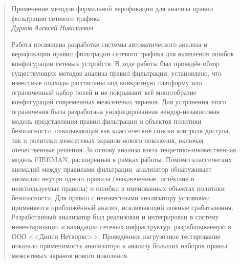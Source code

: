 \begin{abstract}

    \begin{center}
    \large{Применение методов формальной верификации для анализа правил фильтрации сетевого трафика} \\[0.5 cm]
    \large{\textit{Дурнов Алексей Николаевич}} \\[1 cm]
    \end{center}

    Работа посвящена разработке системы автоматического анализа и верификации правил фильтрации сетевого трафика для выявления ошибок конфигурации сетевых устройств.
    В ходе работы был проведён обзор существующих методов анализа правил фильтрации; установлено, что известные подходы рассчитаны под конкретную платформу или ограниченный набор полей и не покрывают всё многообразие конфигураций современных межсетевых экранов.
    Для устранения этого ограничения была разработана унифицированная вендор-независимая модель представления правил фильтрации и объектов политики безопасности, охватывающая как классические списки контроля доступа, так и политики межсетевых экранов нового поколения, включая отечественные решения.
    За основу анализа взята теоретико-множественная модель FIREMAN, расширенная в рамках работы.
    Помимо классических аномалий между правилами фильтрации, анализатор обнаруживает аномалии внутри одного правила (выключенные, истёкшие и неиспользуемые правила) и ошибки в именованных объектах политики безопасности.
    Для правил с неизвестными анализатору условиями применяется приближённый анализ, исключающий ложные срабатывания.
    Разработанный анализатор был реализован и интегрирован в систему инвентаризации и валидации сетевых инфраструктур, разрабатываемую в ООО <<Дипси Нетворкс>>.
    Проведённое нагрузочное тестирование показало применимость анализатора к анализу больших наборов правил межсетевых экранов нового поколения.

\end{abstract}
\newpage
